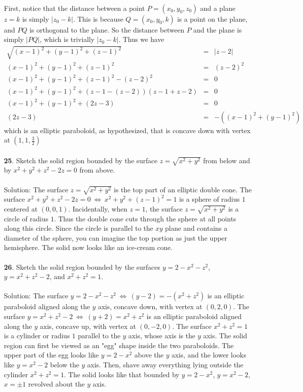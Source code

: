 \documentclass[12pt]{amsbook}
\begin{document}
\\
First, notice that the distance between a point $P=(x_0,y_0,z_0)$ and a plane $z=k$ is simply $|z_0-k|$. This is because $Q=(x_0,y_0,k)$ is a point on the plane, and $PQ$ is orthogonal to the plane. So the distance between $P$ and the plane is simply $|PQ|$, which is trivially $|z_0-k|$. Thus we have
\begin{eqnarray*}
\sqrt{(x-1)^2+(y-1)^2+(z-1)^2}&=&|z-2|\\
(x-1)^2+(y-1)^2+(z-1)^2&=&(z-2)^2\\
(x-1)^2+(y-1)^2+(z-1)^2-(z-2)^2&=&0\\
(x-1)^2+(y-1)^2+(z-1-(z-2))(z-1+z-2)&=&0\\
(x-1)^2+(y-1)^2+(2z-3)&=&0\\
(2z-3)&=&-((x-1)^2+(y-1)^2)
\end{eqnarray*}
which is an elliptic paraboloid, as hypothesized, that is concave down with vertex at $(1,1,\frac{3}{2})$
\\
\\
{\small\bf 25}.  Sketch the solid region bounded by the surface
$z=\sqrt{x^2+y^2}$ from below and by $x^2+y^2+z^2-2z=0$ from
above.\\
\\
{\sc Solution}: The surface $z=\sqrt{x^2+y^2}$ is the top part of an elliptic double cone. The surface $x^2+y^2+z^2-2z=0 \ \Leftrightarrow \ x^2+y^2+(z-1)^2=1$ is a sphere of radius $1$ centered at $(0,0,1)$. Incidentally, when $z=1$, the surface $z=\sqrt{x^2+y^2}$ is a circle of radius $1$. Thus the double cone cuts through the sphere at all points along this circle. Since the circle is parallel to the $xy$ plane and contains a diameter of the sphere, you can imagine the top portion as just the upper hemisphere. The solid now looks like an ice-cream cone.  
\\
\\
{\small\bf 26}.  Sketch the solid region bounded by the 
surfaces $y=2-x^2-z^2$, $y=x^2+z^2-2$, and $x^2+z^2=1$.\\
\\
{\sc Solution}: The surface $y=2-x^2-z^2 \ \Leftrightarrow \  (y-2)=-(x^2+z^2)$ is an elliptic paraboloid aligned along the $y$ axis, concave down, with vertex at $(0,2,0)$. The surface $y=x^2+z^2-2 \ \Leftrightarrow \ (y+2)=x^2+z^2$ is an elliptic paraboloid aligned along the $y$ axis, concave up, with vertex at $(0,-2,0)$. The surface $x^2+z^2=1$ is a cylinder or radius $1$ parallel to the $y$ axis, whose axis is the $y$ axis. The solid region can first be viewed as an "egg" shape inside the two paraboloids. The upper part of the egg looks like $y=2-x^2$ above the $y$ axis, and the lower looks like $y=x^2-2$ below the $y$ axis. Then, shave away everything lying outside the cylinder $x^2+z^2=1$. The solid looks like that bounded by $y=2-x^2$, $y=x^2-2$, $x=\pm 1$ revolved about the $y$ axis. 
\end{document}
